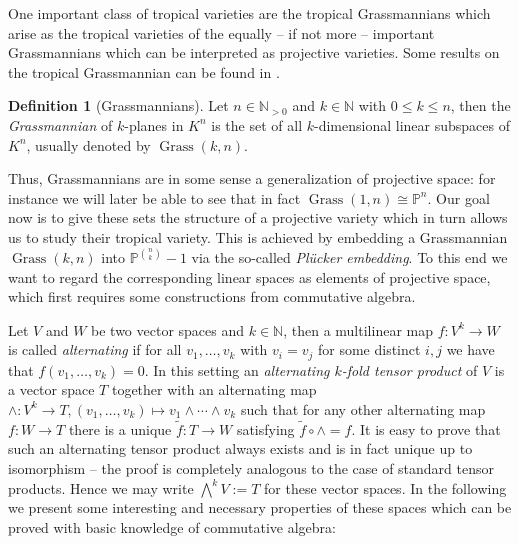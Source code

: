 \documentclass[
  paper=a4,
  titlepage,
  bibliography=totoc,
  listof=totoc,
  pagesize=pdftex
]{scrartcl}
\numberwithin{figure}{section}
\numberwithin{equation}{section}
\numberwithin{table}{section}
\newcommand*\setN{\mathds{N}}
\newcommand*\setP{\mathds{P}}
\DeclareMathOperator{\Grass}{Grass}
\theoremstyle{definition}
\newtheorem{definition}{Definition}
\numberwithin{definition}{section}
\begin{document}
One important class of tropical varieties are the tropical Grassmannians which arise as
the tropical varieties of the equally -- if not more -- important Grassmannians which can
be interpreted as projective varieties. Some results on the tropical Grassmannian can be
found in \cite{tropGrass}.

\begin{definition}[Grassmannians]
  Let $n \in \setN_{>0}$ and $k \in \setN$ with $0 \leq k \leq n$, then the
  \emph{Grassmannian} of $k$-planes in $K^n$ is the set of all $k$-dimensional linear
  subspaces of $K^n$, usually denoted by $\Grass(k, n)$.
\end{definition}

Thus, Grassmannians are in some sense a generalization of projective space: for instance
we will later be able to see that in fact $\Grass(1,n) \cong \setP^n$. Our goal now is to
give these sets the structure of a projective variety which in turn allows us to study
their tropical variety. This is achieved by embedding a Grassmannian $\Grass(k, n)$ into
$\setP^{\binom nk}-1$ via the so-called \emph{Plücker embedding}. To this end we want to
regard the corresponding linear spaces as elements of projective space, which first
requires some constructions from commutative algebra.

Let $V$ and $W$ be two vector spaces and $k\in\setN$, then a multilinear map $f : V^k \to
W$ is called \emph{alternating} if for all $v_1, \dots, v_k$ with $v_i=v_j$ for some
distinct $i,j$ we have that $f(v_1, \dots, v_k) = 0$. In this setting an \emph{alternating
$k$-fold tensor product} of $V$ is a vector space $T$ together with an alternating map
$\wedge:V^k\to T, (v_1, \dots, v_k) \mapsto v_1\wedge\cdots\wedge v_k$ such that for any
other alternating map $f:W\to T$ there is a unique $\tilde f:T\to W$ satisfying $\tilde f
\circ \wedge = f$. It is easy to prove that such an alternating tensor product always
exists and is in fact unique up to isomorphism -- the proof is completely analogous to the
case of standard tensor products. Hence we may write $\bigwedge^k V := T$ for these vector
spaces. In the following we present some interesting and necessary properties of these
spaces which can be proved with basic knowledge of commutative algebra:
\end{document}
